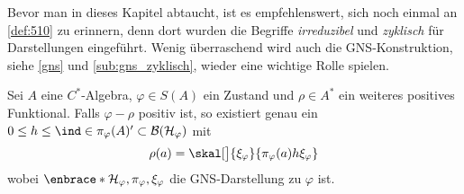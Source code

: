 Bevor man in dieses Kapitel abtaucht, ist es empfehlenswert, sich noch einmal an \autoref{def:510} zu erinnern, denn dort wurden die Begriffe \emph{irreduzibel} und \emph{zyklisch} für Darstellungen eingeführt.
Wenig überraschend wird auch die GNS-Konstruktion, siehe \autoref{gns} und \cref{sub:gns_zyklisch}, wieder eine wichtige Rolle spielen.

\begin{proposition}[label=prop:71,{name=[über positive Funktionale, die kleiner als Zustände sind]}]
	Sei $A$ eine $C^*$-Algebra, $\varphi \in S(A)$ ein Zustand und $\rho \in A^*$ ein weiteres positives Funktional.
	Falls $\varphi-\rho$ positiv ist, so existiert genau ein $0 \le h \le \ind \in \pi_\varphi(A)' \subset \mathcal{B}(\mathcal{H}_\varphi)$ mit 
	\[
		\rho(a) = \skal[\big]{\xi_\varphi}{\pi_\varphi(a)h \xi_\varphi}
	\]
	wobei $\enbrace*{\mathcal{H}_\varphi,\pi_\varphi,\xi_\varphi}$ die GNS-Darstellung zu $\varphi$ ist.
\end{proposition}
